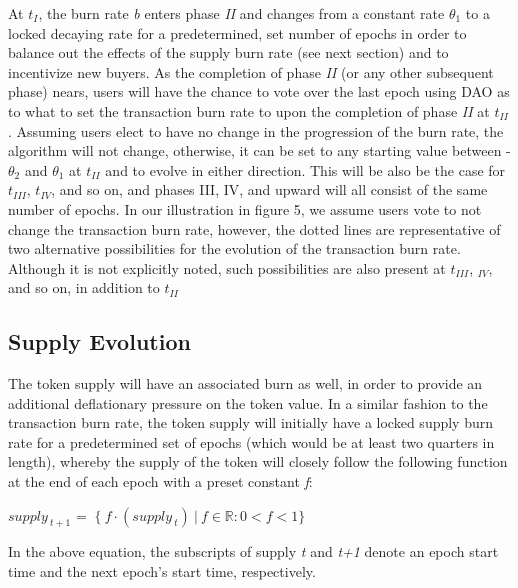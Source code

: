 \documentclass[12pt]{article}
\begin{document}
    \vspace{0.15cm}
    
    At \emph{$t_I$}, the burn rate \emph{b} enters phase \emph{II} and changes from a constant rate \(\theta_1\) to a locked decaying rate for a predetermined, set number of epochs in order to balance out the effects of the supply burn rate (see next section) and to incentivize new buyers. As the completion of phase \emph{II} (or any other subsequent phase) nears, users will have the chance to vote over the last epoch using DAO as to what to set the transaction burn rate to upon the completion of phase \emph{II} at \emph{$t_{II}$}. Assuming users elect to have no change in the progression of the burn rate, the algorithm will not change, otherwise, it can be set to any starting value between -\(\theta_2\) and \(\theta_1\) at \emph{$t_{II}$} and to evolve in either direction. This will be also be the case for \emph{$t_{III}$}, \emph{$t_{IV}$}, and so on, and phases III, IV, and upward will all consist of the same number of epochs. In our illustration in figure 5, we assume users vote to not change the transaction burn rate, however, the dotted lines are representative of two alternative possibilities for the evolution of the transaction burn rate. Although it is not explicitly noted, such possibilities are also present at \emph{$t_{III}$}, \emph{$_{IV}$}, and so on, in addition to \emph{$t_{II}$}
    
    \subsection{Supply Evolution}
    
    The token supply will have an associated burn as well, in order to provide an additional deflationary pressure on the token value. In a similar fashion to the transaction burn rate, the token supply will initially have a locked supply burn rate for a predetermined set of epochs (which would be at least two quarters in length), whereby the supply of the token will closely follow the following function at the end of each epoch with a preset constant \emph{f}: \par
    \vspace{0.15cm}
    \noindent

    {
    \centering
    ${supply_{~t+1}}$ = $~\{~f\cdot(supply_{~t})~|~f\in\mathbb{R}:0<f<1\}$
    
    \vspace{0.15cm}}
    
    \noindent
    In the above equation, the subscripts of supply \emph{t} and \emph{t+1} denote an epoch start time and the next epoch's start time, respectively. \par
    
\end{document}
